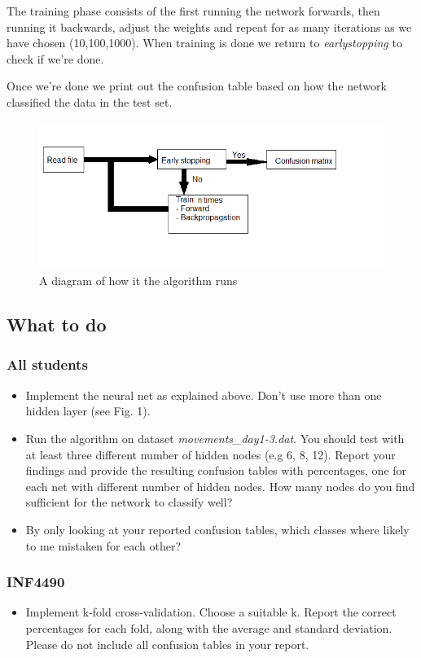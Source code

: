 \documentclass{article}           %
\begin{document}
The training phase consists of the first running the network forwards, then running it backwards, adjust the weights and repeat for as many iterations as we have chosen (10,100,1000). When training is done we return to \emph{earlystopping} to check if we're done.

Once we're done we print out the confusion table based on how the network classified the data in the test set.

\begin{figure}[h]
    \centering
    \includegraphics[scale=0.5]{figures/diagram.png}
    \caption{A diagram of how it the algorithm runs}
    \label{fig:awesome_image}
\end{figure}

\subsection*{What to do}

\subsubsection*{All students}
\begin{itemize}
\item Implement the neural net as explained above. Don't use more than one hidden layer (see Fig. 1).
\item Run the algorithm on dataset \emph{movements\_day1-3.dat}. You should test with at least three different number of hidden nodes (e.g 6, 8, 12). Report your findings and provide the resulting confusion tables with percentages, one for each net with different number of hidden nodes. How many nodes do you find sufficient for the network to classify well?
\item By only looking at your reported confusion tables, which classes where likely to me mistaken for each other?
\end{itemize}

\subsubsection*{INF4490}
\begin{itemize}
\item Implement k-fold cross-validation. Choose a suitable k. Report the correct percentages for each fold, along with the average and standard deviation. Please do not include all confusion tables in your report.
\end{itemize}


\end{document}
